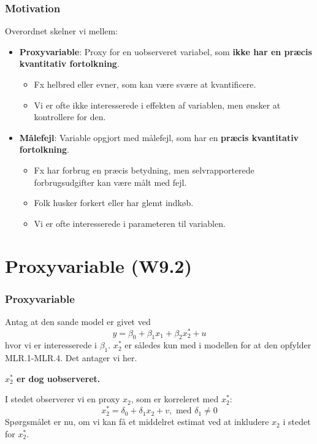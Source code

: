 \documentclass[aspectratio=43,t]{beamer}
\begin{document}
\begin{frame}
\frametitle{Motivation}

	Overordnet skelner vi mellem:
	\begin{itemize}

\item \textbf{Proxyvariable}: Proxy for en uobserveret variabel, som \textbf{ikke har en præcis kvantitativ fortolkning}.
\smallskip

\begin{itemize}
\item Fx helbred eller evner, som kan være svære at kvantificere.

\item Vi er ofte ikke interesserede i effekten af variablen, men ønsker at kontrollere for den.
\end{itemize}
\medskip
	
\item \textbf{Målefejl}: Variable opgjort med målefejl, som har en \textbf{præcis kvantitativ fortolkning}.
\smallskip

\begin{itemize}
\item Fx har forbrug en præcis betydning, men selvrapporterede
forbrugsudgifter kan være målt med fejl.
\item Folk husker forkert eller har glemt indkøb.

\item Vi er ofte interesserede i parameteren til variablen.

\end{itemize}

\end{itemize}

\end{frame}
	


\section[Proxyvariable]{Proxyvariable (W9.2)}


\begin{frame}
\frametitle{Proxyvariable}

	Antag at den sande model er givet ved
	\begin{equation}
	y = \beta_0 + \beta_1 x_1 + \beta_2 x^*_2 + u
	\end{equation}
	hvor vi er interesserede i $\beta_1$.
	$x^*_2$ er således kun med i modellen for at den opfylder MLR.1-MLR.4. Det antager vi her.
	
	\textbf{$x^*_2$ er dog uobserveret.}
	
	I stedet observerer vi en proxy $x_2$, som er korreleret med $x^*_2$:
	\begin{equation}
	x^*_2 = \delta_0 + \delta_1 x_2 + v, \text{ med } \delta_1 \neq 0
	\end{equation}
	Spørgsmålet er nu, om vi kan få et middelret estimat ved at inkludere $x_2$ i stedet for $x^*_2$.
		
\end{frame}
\end{document}
